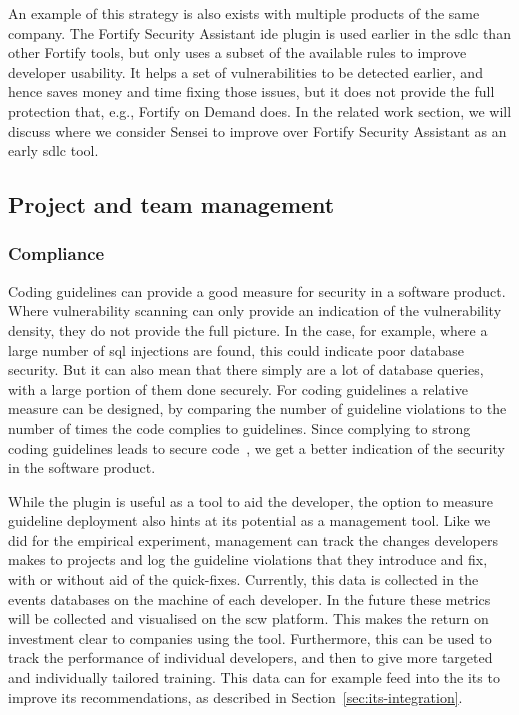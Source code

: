 An example of this strategy is also exists with multiple products of the same company. 
The Fortify Security Assistant \gls{ide} plugin is used earlier in the \gls{sdlc} than other Fortify tools, but only uses a subset of the available rules to improve developer usability.
It helps a set of vulnerabilities to be detected earlier, and hence saves money and time fixing those issues, but it does not provide the full protection that, e.g., Fortify on Demand does.
In the related work section, we will discuss where we consider Sensei to improve over Fortify Security Assistant as an early \gls{sdlc} tool.

\subsection{Project and team management}
\subsubsection{Compliance}
Coding guidelines can provide a good measure for security in a software product.
Where vulnerability scanning can only provide an indication of the vulnerability density, they do not provide the full picture.
In the case, for example, where a large number of \gls{sql} injections are found, this could indicate poor database security.
But it can also mean that there simply are a lot of database queries, with a large portion of them done securely.
For coding guidelines a relative measure can be designed, by comparing the number of guideline violations to the number of times the code complies to guidelines. Since complying to strong coding guidelines leads to secure code~\cite{banerjee2009software,tabassum2017comparing}, we get a better indication of the security in the software product.

While the plugin is useful as a tool to aid the developer, the option to measure guideline deployment also hints at its potential as a management tool.
Like we did for the empirical experiment, management can track the changes developers makes to projects and log the guideline violations that they introduce and fix, with or without aid of the quick-fixes.
Currently, this data is collected in the events databases on the machine of each developer.
In the future these metrics will be collected and visualised on the \gls{scw} platform.
This makes the return on investment clear to companies using the tool.
Furthermore, this can be used to track the performance of individual developers, and then to give more targeted and individually tailored training.
This data can for example feed into the \gls{its} to improve its recommendations, as described in Section~\ref{sec:its-integration}.

